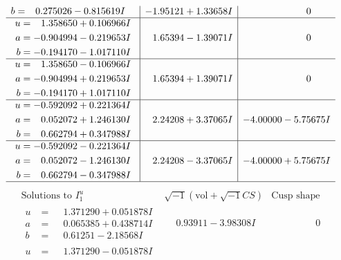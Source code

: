 \documentclass[1p]{elsarticle_modified}
\theoremstyle{definition}
\newcommand{\I}{\sqrt{-1}}
\begin{document}
$$\begin{array}{c|c|c}
\begin{aligned}
b &= \phantom{-}0.275026 - 0.815619 I\end{aligned}
 & -1.95121 + 1.33658 I & \phantom{-0.000000 } 0 \\ \hline\begin{aligned}
u &= \phantom{-}1.358650 + 0.106966 I \\
a &= -0.904994 - 0.219653 I \\
b &= -0.194170 - 1.017110 I\end{aligned}
 & \phantom{-}1.65394 - 1.39071 I & \phantom{-0.000000 } 0 \\ \hline\begin{aligned}
u &= \phantom{-}1.358650 - 0.106966 I \\
a &= -0.904994 + 0.219653 I \\
b &= -0.194170 + 1.017110 I\end{aligned}
 & \phantom{-}1.65394 + 1.39071 I & \phantom{-0.000000 } 0 \\ \hline\begin{aligned}
u &= -0.592092 + 0.221364 I \\
a &= \phantom{-}0.052072 + 1.246130 I \\
b &= \phantom{-}0.662794 + 0.347988 I\end{aligned}
 & \phantom{-}2.24208 + 3.37065 I & -4.00000 - 5.75675 I \\ \hline\begin{aligned}
u &= -0.592092 - 0.221364 I \\
a &= \phantom{-}0.052072 - 1.246130 I \\
b &= \phantom{-}0.662794 - 0.347988 I\end{aligned}
 & \phantom{-}2.24208 - 3.37065 I & -4.00000 + 5.75675 I\\
 \hline 
 \end{array}$$\newpage$$\begin{array}{c|c|c}  
\text{Solutions to }I^u_{1}& \I (\text{vol} + \sqrt{-1}CS) & \text{Cusp shape}\\
 \hline 
\begin{aligned}
u &= \phantom{-}1.371290 + 0.051878 I \\
a &= \phantom{-}0.065385 + 0.438714 I \\
b &= \phantom{-}0.61251 - 2.18568 I\end{aligned}
 & \phantom{-}0.93911 - 3.98308 I & \phantom{-0.000000 } 0 \\ \hline\begin{aligned}
u &= \phantom{-}1.371290 - 0.051878 I \\

\end{aligned}
\end{array}$$
\end{document}
